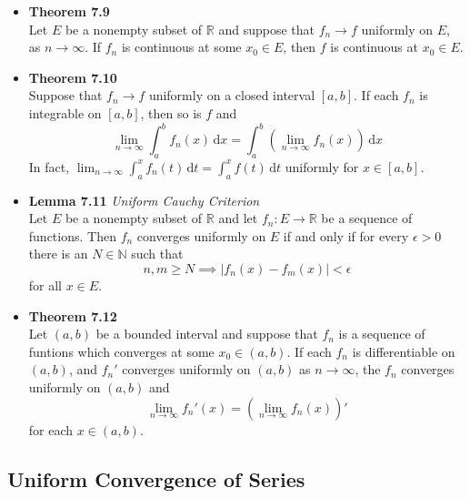 \documentclass[11pt,a4paper]{article}
\begin{document}
\begin{itemize}
    \item \textbf{Theorem 7.9} \\
        Let $E$ be a nonempty subset of $\mathbb{R}$ and suppose that $f_n \to f$ uniformly
        on $E$, as $n \to \infty$.
        If $f_n$ is continuous at some $x_0 \in E$, then $f$ is continuous at $x_0 \in E$.

    \item \textbf{Theorem 7.10} \\
        Suppose that $f_n \to f$ uniformly on a closed interval $[a, b]$.
        If each $f_n$ is integrable on $[a, b]$, then so is $f$ and
        \[
            \lim_{n \to \infty} \int_a^b f_n(x)\, \mathrm{d}x =
            \int_a^b \left( \lim_{n \to \infty} f_n(x)\right)\, \mathrm{d}x
        \]
        In fact, $\lim_{n \to \infty} \int_a^x f_n(t)\, \mathrm{d}t =
        \int_a^x f(t)\, \mathrm{d}t$ uniformly for $x \in [a, b]$.

    \item \textbf{Lemma 7.11} \emph{Uniform Cauchy Criterion} \\
        Let $E$ be a nonempty subset of $\mathbb{R}$ and let $f_n : E \to \mathbb{R}$ be
        a sequence of functions.
        Then $f_n$ converges uniformly on $E$ if and only if for every $\epsilon > 0$
        there is an $N \in \mathbb{N}$ such that
        \[
            n, m \geq N \implies |f_n(x) - f_m(x)| < \epsilon
        \]
        for all $x \in E$.

    \item \textbf{Theorem 7.12} \\
        Let $(a, b)$ be a bounded interval and suppose that $f_n$ is a sequence of funtions
        which converges at some $x_0 \in (a, b)$.
        If each $f_n$ is differentiable on $(a, b)$, and $f_n'$ converges uniformly on
        $(a, b)$ as $n \to \infty$, the $f_n$ converges uniformly on $(a, b)$ and
        \[
            \lim_{n \to \infty} f_n'(x) = \left( \lim_{n \to \infty} f_n(x) \right)'
        \]
        for each $x \in (a, b)$.

\end{itemize}

\subsection{Uniform Convergence of Series}
\end{document}

